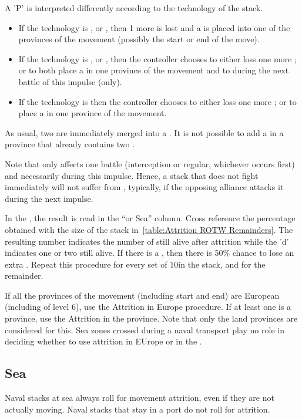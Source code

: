 A 'P' is interpreted differently according to the technology of the stack.
\begin{itemize}
\item If the technology is \TMED, \TREN or \TARQ, then 1 more \LD is lost and
  a \PILLAGE\facemoins is placed into one of the provinces of the movement
  (possibly the start or end of the move).
\item If the technology is \TMUS, \TBAR or \TMAN, then the controller chooses
  to either loss one more \LD; or to both place a \PILLAGE\facemoins in one
  province of the movement and to  during the next battle of
  this impulse (only).
\item If the technology is \TL then the controller chooses
  to either loss one more \LD; or to place a \PILLAGE\facemoins in one
  province of the movement.
\end{itemize}
As usual, two \PILLAGE\Facemoins are immediately merged into a
\PILLAGE\Faceplus. It is not possible to add a \PILLAGE in a province that
already contains two \PILLAGE\Faceplus.

Note that  only affects one battle (interception or regular,
whichever occurs first) and necessarily during this impulse. Hence, a stack
that does not fight immediately will not suffer from ,
typically, if the opposing alliance attacks it during the next impulse.

\smallskip

In the \ROTW, the result is read in the ``\ROTW or Sea'' column. Cross
reference the percentage obtained with the size of the stack
in~\ref{table:Attrition ROTW Remainders}. The resulting number indicates the
number of \LD still alive after attrition while the 'd' indicates one or two
\LDE still alive. If there is a \textetoile, then there is 50\% chance to lose
an extra \LDE. Repeat this procedure for every set of 10\LD in the stack, and
for the remainder.

If all the provinces of the movement (including start and end) are European
(including \COL of level 6), use the Attrition in Europe procedure. If at
least one is a \ROTW province, use the Attrition in the \ROTW province. Note
that only the land provinces are considered for this. Sea zones crossed during
a naval transport play no role in deciding whether to use attrition in EUrope
or in the \ROTW.

\subsection{Sea}
Naval stacks at sea always roll for movement attrition, even if they are not
actually moving. Naval stacks that stay in a port do not roll for attrition.

